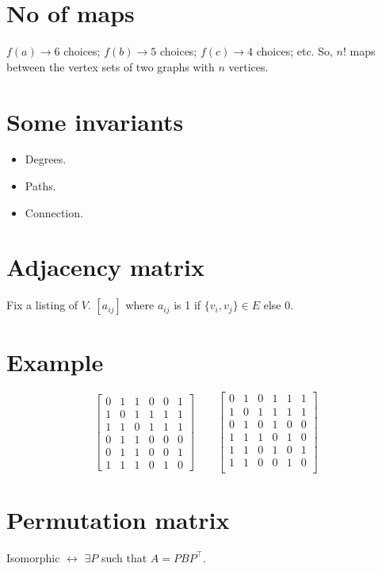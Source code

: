 \documentclass{iansnotes}
\begin{document}
  \section*{No of maps}
    \(f(a) \rightarrow 6\) choices; \(f(b) \rightarrow 5\) choices; \(f(c) \rightarrow 4\) choices; etc.
    So, \(n!\) maps between the vertex sets of two graphs with \(n\) vertices.
  
  \section*{Some invariants}
    \begin{itemize}
      \item Degrees.
      \item Paths.
      \item Connection.
    \end{itemize}

  \section*{Adjacency matrix}
    Fix a listing of \(V\).
    \([a_{ij}]\) where \(a_{ij}\) is 1 if \(\{v_i,v_j\} \in E \) else 0.
  
  \section*{Example}
  \[
    \begin{bmatrix}
      0 & 1 & 1 & 0 & 0 & 1 \\
      1 & 0 & 1 & 1 & 1 & 1 \\
      1 & 1 & 0 & 1 & 1 & 1 \\
      0 & 1 & 1 & 0 & 0 & 0 \\
      0 & 1 & 1 & 0 & 0 & 1 \\
      1 & 1 & 1 & 0 & 1 & 0 
    \end{bmatrix}
    \qquad
    \begin{bmatrix}
      0 & 1 & 0 & 1 & 1 & 1 \\
      1 & 0 & 1 & 1 & 1 & 1 \\
      0 & 1 & 0 & 1 & 0 & 0 \\
      1 & 1 & 1 & 0 & 1 & 0 \\
      1 & 1 & 0 & 1 & 0 & 1 \\
      1 & 1 & 0 & 0 & 1 & 0 \\
    \end{bmatrix}
  \]

  \section*{Permutation matrix}
  Isomorphic \(\leftrightarrow\) \(\exists P\) such that \(A = PBP^\intercal\).
\end{document}

